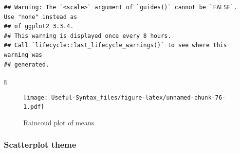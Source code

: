 \documentclass[
]{article}
\newenvironment{Shaded}{\begin{snugshade}}{\end{snugshade}}
\newcommand{\NormalTok}[1]{#1}
\begin{document}
\begin{verbatim}
## Warning: The `<scale>` argument of `guides()` cannot be `FALSE`. Use "none" instead as
## of ggplot2 3.3.4.
## This warning is displayed once every 8 hours.
## Call `lifecycle::last_lifecycle_warnings()` to see where this warning was
## generated.
\end{verbatim}

\begin{Shaded}
\begin{Highlighting}[]
\NormalTok{g}
\end{Highlighting}
\end{Shaded}

\begin{figure}
\centering
\texttt{[image: Useful-Syntax\_files/figure-latex/unnamed-chunk-76-1.pdf]}
\caption{\label{fig:unnamed-chunk-76}Raincoud plot of means}
\end{figure}

\hypertarget{scatterplot-theme}{%
\subsubsection{Scatterplot theme}\label{scatterplot-theme}}
\end{document}
